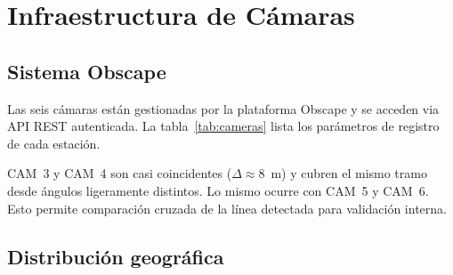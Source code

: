 \chapter{Infraestructura de Cámaras}
\label{ch:cameras}

\section{Sistema Obscape}

Las seis cámaras están gestionadas por la plataforma Obscape y se acceden via API REST
autenticada. La tabla~\ref{tab:cameras} lista los parámetros de registro de cada estación.

\begin{table}[H]
\centering
\caption{Estaciones Obscape en Guardamar del Segura}
\label{tab:cameras}
{\small{}}
\end{table}

\begin{warnbox}
CAM~3 y CAM~4 son casi coincidentes ($\Delta \approx 8$~m) y cubren el mismo tramo desde
ángulos ligeramente distintos. Lo mismo ocurre con CAM~5 y CAM~6. Esto permite comparación
cruzada de la línea detectada para validación interna.
\end{warnbox}

\section{Distribución geográfica}

